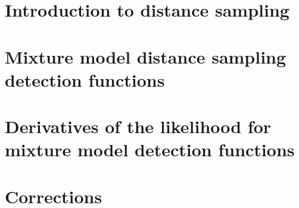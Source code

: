 \documentclass[12pt]{report}
\begin{document}
\chapter{Introduction to distance sampling}



\chapter{Mixture model distance sampling detection functions}



\appendix

%
%
%

\chapter{Derivatives of the likelihood for mixture model detection functions}







\chapter*{Corrections}

\end{document}

